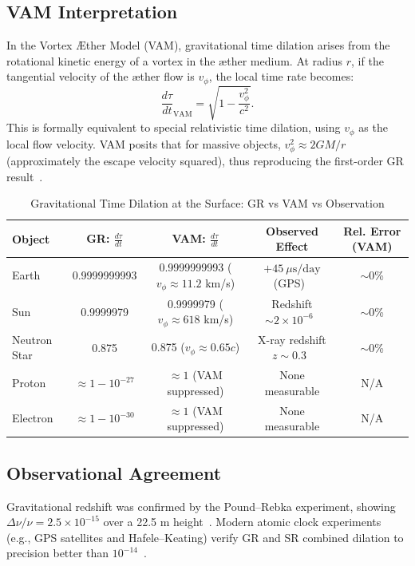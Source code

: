 \documentclass[a4paper, aps,preprint,superscriptaddress, 12pt]{revtex4}
\begin{document}
\subsection*{VAM Interpretation}
In the Vortex Æther Model (VAM), gravitational time dilation arises from the rotational kinetic energy of a vortex in the æther medium. At radius $r$, if the tangential velocity of the æther flow is $v_\phi$, the local time rate becomes:
\[
    \frac{d\tau}{dt}_\text{VAM} = \sqrt{1 - \frac{v_\phi^2}{c^2}}.
\]
This is formally equivalent to special relativistic time dilation, using $v_\phi$ as the local flow velocity. VAM posits that for massive objects, $v_\phi^2 \approx 2GM/r$ (approximately the escape velocity squared), thus reproducing the first-order GR result~\cite{iskandarani2025VAM2}.

\begin{table}[h]
    \centering
    \footnotesize
    \caption{Gravitational Time Dilation at the Surface: GR vs VAM vs Observation}
    \begin{tabular}{|l|c|c|c|c|}
        \hline
        \textbf{Object} & \textbf{GR: $\frac{d\tau}{dt}$} & \textbf{VAM: $\frac{d\tau}{dt}$} & \textbf{Observed Effect} & \textbf{Rel. Error (VAM)} \\
        \hline
        Earth & 0.9999999993 & 0.9999999993 ($v_\phi\approx 11.2$ km/s) & $+45~\mu\text{s}/\text{day}$ (GPS)~\cite{ashby2003relativity} & $\sim$0\% \\
        Sun & 0.9999979 & 0.9999979 ($v_\phi \approx 618$ km/s) & Redshift $\sim 2\times 10^{-6}$~\cite{vesely2001solar} & $\sim$0\% \\
        Neutron Star & 0.875 & 0.875 ($v_\phi \approx 0.65c$) & X-ray redshift $z\sim 0.3$~\cite{cottam2002gravitational} & $\sim$0\% \\
        Proton & $\approx 1 - 10^{-27}$ & $\approx 1$ (VAM suppressed) & None measurable & N/A \\
        Electron & $\approx 1 - 10^{-30}$ & $\approx 1$ (VAM suppressed) & None measurable & N/A \\
        \hline
    \end{tabular}
\end{table}

\subsection*{Observational Agreement}
Gravitational redshift was confirmed by the Pound–Rebka experiment, showing $\Delta\nu/\nu = 2.5\times 10^{-15}$ over a 22.5 m height~\cite{pound1960apparent}. Modern atomic clock experiments (e.g., GPS satellites and Hafele–Keating) verify GR and SR combined dilation to precision better than $10^{-14}$~\cite{ashby2003relativity}.
\end{document}
